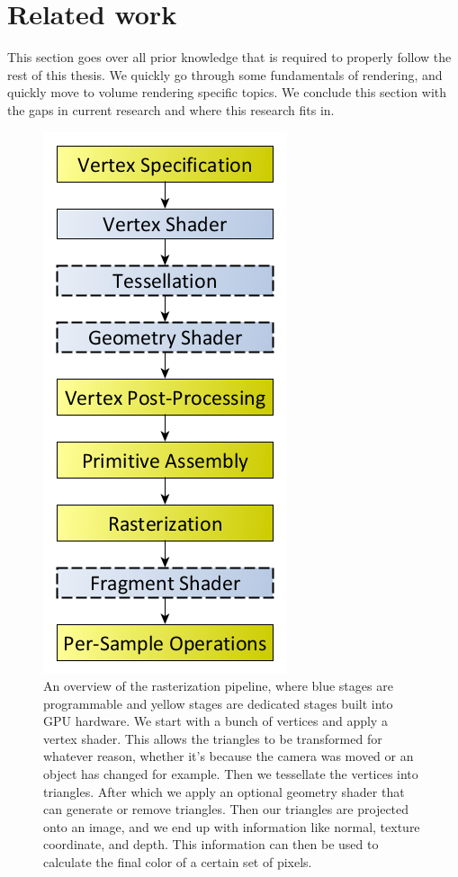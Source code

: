 \section{Related work} \label{related_work}
This section goes over all prior knowledge that is required to properly follow the rest of this thesis. We quickly go through some fundamentals of rendering, and quickly move to volume rendering specific topics. We conclude this section with the gaps in current research and where this research fits in.



\begin{figure}
    \centering
    \includegraphics[width=0.5\linewidth]{figures/rasterization_pipeline.png}
    \caption{An overview of the rasterization pipeline, where blue stages are programmable and yellow stages are dedicated stages built into GPU hardware. We start with a bunch of vertices and apply a vertex shader. This allows the triangles to be transformed for whatever reason, whether it's because the camera was moved or an object has changed for example. Then we tessellate the vertices into triangles. After which we apply an optional geometry shader that can generate or remove triangles. Then our triangles are projected onto an image, and we end up with information like normal, texture coordinate, and depth. This information can then be used to calculate the final color of a certain set of pixels. \cite{RasterPipeline}}
    \label{fig:rasterization_pipeline}
\end{figure}


